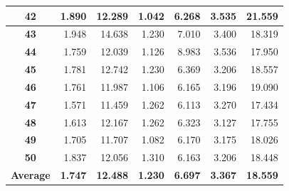 \documentclass[12pt]{article}
\begin{document}
\begin{table}[!htbp]
{\begin{tabular}{crrrrr|r|}
\multicolumn{1}{|c|}{\textbf{42}} & \multicolumn{1}{r|}{1.890} & \multicolumn{1}{r|}{12.289} & \multicolumn{1}{r|}{1.042} & \multicolumn{1}{r|}{6.268} & 3.535 & 21.559 \\ \hline
\multicolumn{1}{|c|}{\textbf{43}} & \multicolumn{1}{r|}{1.948} & \multicolumn{1}{r|}{14.638} & \multicolumn{1}{r|}{1.230} & \multicolumn{1}{r|}{7.010} & 3.400 & 18.319 \\ \hline
\multicolumn{1}{|c|}{\textbf{44}} & \multicolumn{1}{r|}{1.759} & \multicolumn{1}{r|}{12.039} & \multicolumn{1}{r|}{1.126} & \multicolumn{1}{r|}{8.983} & 3.536 & 17.950 \\ \hline
\multicolumn{1}{|c|}{\textbf{45}} & \multicolumn{1}{r|}{1.781} & \multicolumn{1}{r|}{12.742} & \multicolumn{1}{r|}{1.230} & \multicolumn{1}{r|}{6.369} & 3.206 & 18.557 \\ \hline
\multicolumn{1}{|c|}{\textbf{46}} & \multicolumn{1}{r|}{1.761} & \multicolumn{1}{r|}{11.987} & \multicolumn{1}{r|}{1.106} & \multicolumn{1}{r|}{6.165} & 3.196 & 19.090 \\ \hline
\multicolumn{1}{|c|}{\textbf{47}} & \multicolumn{1}{r|}{1.571} & \multicolumn{1}{r|}{11.459} & \multicolumn{1}{r|}{1.262} & \multicolumn{1}{r|}{6.113} & 3.270 & 17.434 \\ \hline
\multicolumn{1}{|c|}{\textbf{48}} & \multicolumn{1}{r|}{1.613} & \multicolumn{1}{r|}{12.167} & \multicolumn{1}{r|}{1.262} & \multicolumn{1}{r|}{6.323} & 3.127 & 17.755 \\ \hline
\multicolumn{1}{|c|}{\textbf{49}} & \multicolumn{1}{r|}{1.705} & \multicolumn{1}{r|}{11.707} & \multicolumn{1}{r|}{1.082} & \multicolumn{1}{r|}{6.170} & 3.175 & 18.026 \\ \hline
\multicolumn{1}{|c|}{\textbf{50}} & \multicolumn{1}{r|}{1.837} & \multicolumn{1}{r|}{12.056} & \multicolumn{1}{r|}{1.310} & \multicolumn{1}{r|}{6.163} & 3.206 & 18.448 \\ \hline
\multicolumn{1}{|c|}{\textbf{Average}} & \multicolumn{1}{r|}{\textbf{1.747}} & \multicolumn{1}{r|}{\textbf{12.488}} & \multicolumn{1}{r|}{\textbf{1.230}} & \multicolumn{1}{r|}{\textbf{6.697}} & \textbf{3.367} & \textbf{18.559} \\ \hline
\end{tabular}%
}
\end{table}
\end{document}
